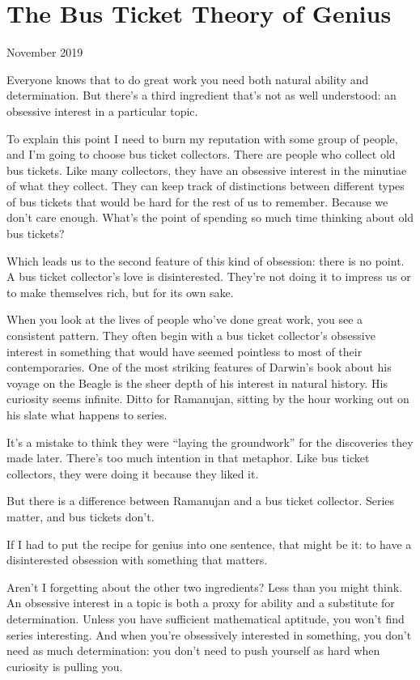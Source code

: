 \chapter{The Bus Ticket Theory of Genius}

November 2019

Everyone knows that to do great work you need both natural ability and
determination. But there's a third ingredient that's not as well
understood: an obsessive interest in a particular topic.

To explain this point I need to burn my reputation with some group of
people, and I'm going to choose bus ticket collectors. There are people
who collect old bus tickets. Like many collectors, they have an
obsessive interest in the minutiae of what they collect. They can keep
track of distinctions between different types of bus tickets that would
be hard for the rest of us to remember. Because we don't care enough.
What's the point of spending so much time thinking about old bus
tickets?

Which leads us to the second feature of this kind of obsession: there is
no point. A bus ticket collector's love is disinterested. They're not
doing it to impress us or to make themselves rich, but for its own sake.

When you look at the lives of people who've done great work, you see a
consistent pattern. They often begin with a bus ticket collector's
obsessive interest in something that would have seemed pointless to most
of their contemporaries. One of the most striking features of Darwin's
book about his voyage on the Beagle is the sheer depth of his interest
in natural history. His curiosity seems infinite. Ditto for Ramanujan,
sitting by the hour working out on his slate what happens to series.

It's a mistake to think they were ``laying the groundwork'' for the
discoveries they made later. There's too much intention in that
metaphor. Like bus ticket collectors, they were doing it because they
liked it.

But there is a difference between Ramanujan and a bus ticket collector.
Series matter, and bus tickets don't.

If I had to put the recipe for genius into one sentence, that might be
it: to have a disinterested obsession with something that matters.

Aren't I forgetting about the other two ingredients? Less than you might
think. An obsessive interest in a topic is both a proxy for ability and
a substitute for determination. Unless you have sufficient mathematical
aptitude, you won't find series interesting. And when you're obsessively
interested in something, you don't need as much determination: you don't
need to push yourself as hard when curiosity is pulling you.

